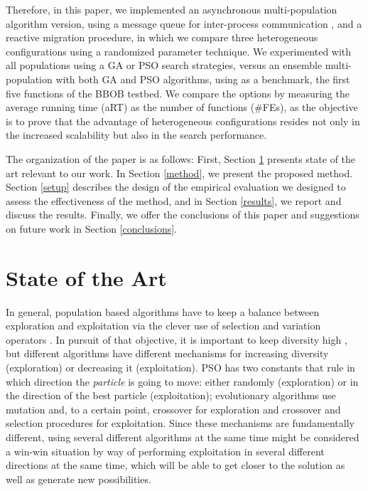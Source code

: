 Therefore, in this paper, we implemented an asynchronous multi-population
algorithm version, using a message queue for inter-process communication \cite{
guervos2018introducing}, and a reactive migration procedure, in which we compare
three heterogeneous configurations using a randomized parameter technique. We
experimented with all populations using a GA or PSO search strategies, versus an
ensemble multi-population with both GA and PSO algorithms, using as a benchmark,
the first five functions of the BBOB testbed. We compare the options by
measuring the average running time (aRT) as the number of functions (\#FEs), as
the objective is to prove that the advantage of heterogeneous configurations
resides not only in the increased scalability but also in the search
performance. 

The organization of the paper is as follows: First, Section \ref{soa} presents
state of the art relevant to our work. In Section \ref{method}, we present the
proposed method.  Section \ref{setup} describes the design of the empirical
evaluation we designed to assess the effectiveness of the method, and in Section
\ref{results}, we report and discuss the results. Finally, we offer the
conclusions of this paper and suggestions on future work in Section
\ref{conclusions}.


\section{State of the Art}
\label{soa}

In general, population based algorithms have to keep a balance between
exploration and exploitation via the clever use of selection and
variation operators \cite{vcrepinvsek2013exploration}. In pursuit of
that objective, it is important to keep diversity high
\cite{yuan2005importance}, but different algorithms have different
mechanisms for increasing diversity (exploration) or decreasing it
(exploitation). PSO has two constants that rule in which direction the
{\em particle} is going to move: either randomly (exploration) or in
the direction of the best particle (exploitation); evolutionary
algorithms use mutation and, to a certain point, crossover for
exploration and crossover and selection procedures for
exploitation. Since these mechanisms are fundamentally different,
using several different algorithms at the same time might be
considered a win-win situation by way of performing exploitation in
several different directions at the same time, which will be able to
get closer to the solution as well as generate new possibilities.

